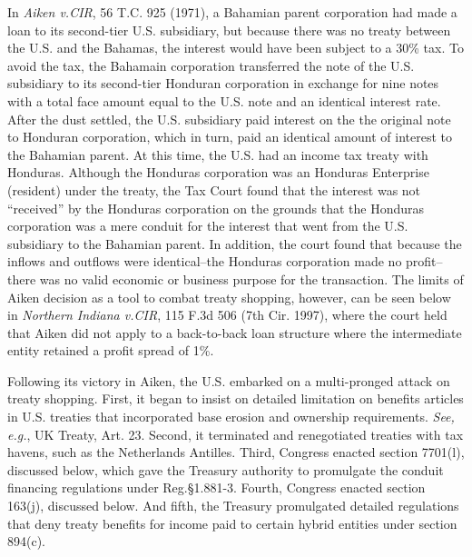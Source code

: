 In \emph{Aiken v.\@ CIR}, 56 T.C. 925 (1971), a Bahamian parent corporation had made a loan to its second-tier U.S. subsidiary, but because there was no treaty between the U.S. and the Bahamas, the interest would have been subject to a 30\% tax.  To avoid the tax, the Bahamain corporation transferred the note of the U.S. subsidiary to its second-tier Honduran corporation in exchange for nine notes with a total face amount equal to the U.S. note and an identical interest rate.  After the dust settled, the U.S. subsidiary paid interest on the the original note to Honduran corporation, which in turn, paid an identical amount of interest to the Bahamian parent.  At this time, the U.S. had an income tax treaty with Honduras.  Although the Honduras corporation was an Honduras Enterprise (resident) under the treaty, the Tax Court found that the interest was not ``received'' by the Honduras corporation on the grounds that the Honduras corporation was a mere conduit for the interest that went from the U.S. subsidiary to the Bahamian parent.  In addition, the court found that because the inflows and outflows were identical--the Honduras corporation made no profit--there was no valid economic or business purpose for the transaction.  The limits of Aiken decision as a tool to combat treaty shopping, however, can be seen below in \emph{Northern Indiana v.\@ CIR}, 115 F.3d 506 (7th Cir. 1997), where the court held that Aiken did not apply to a back-to-back loan structure where the intermediate entity retained a profit spread of 1\%.    

Following its victory in Aiken, the U.S. embarked on a multi-pronged attack on treaty shopping.  First, it began to insist on detailed limitation on benefits articles in U.S. treaties that incorporated base erosion and ownership requirements.  \emph{See, e.g.}, UK Treaty, Art. 23.  Second, it terminated and renegotiated treaties with tax havens, such as the Netherlands Antilles.  Third, Congress enacted section 7701(l), discussed below, which gave the Treasury authority to promulgate the conduit financing regulations under Reg.\@ \S1.881-3.  Fourth, Congress enacted section 163(j), discussed below.  And fifth, the Treasury promulgated detailed regulations that deny treaty benefits for income paid to certain hybrid entities under section 894(c).
         
